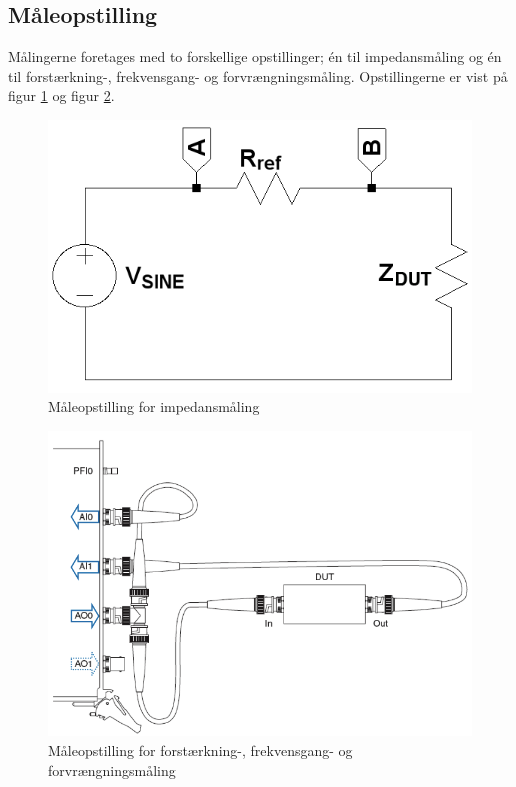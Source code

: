 \subsection*{Måleopstilling}
Målingerne foretages med to forskellige opstillinger; én til impedansmåling og én til forstærkning-, frekvensgang- og forvrængningsmåling. Opstillingerne er vist på figur \ref{fig:maaleop-imp} og figur \ref{fig:maaleop-thd:forfor}.%

\begin{figure}[h]
\centering
\includegraphics[scale=0.25]{maalerapporter/forforstaerker/impedansopstilling-forforstaerker.png}
\caption{Måleopstilling for impedansmåling}
\label{fig:maaleop-imp}
\end{figure}

\begin{figure}[h]
\centering
\includegraphics[scale=0.3]{maalerapporter/forforstaerker/maaleopstilling-thd-forforstaerker.png}
\caption{Måleopstilling for forstærkning-, frekvensgang- og forvrængningsmåling \cite{maaling-mm5}}
\label{fig:maaleop-thd:forfor}
\end{figure}

